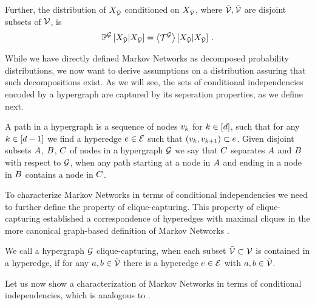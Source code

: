 Further, the distribution of $X_{\tilde{\mathcal{V}}}$ conditioned on $X_{\bar{\mathcal{V}}}$, where $\tilde{\mathcal{V}},\bar{\mathcal{V}}$ are disjoint subsets of $\mathcal{V}$, is
\begin{align*}
    \mathbb{P}^{\mathcal{G}}\left[X_{\tilde{\mathcal{V}}}|X_{\bar{\mathcal{V}}}\right]
    = \left\langle \mathcal{T}^{\mathcal{G}}\right\rangle \left[ X_{\tilde{\mathcal{V}}} | X_{\bar{\mathcal{V}}} \right] \, .
\end{align*}

While we have directly defined Markov Networks as decomposed probability distributions, we now want to derive assumptions on a distribution assuring that such decompositions exist.
As we will see, the sets of conditional independencies encoded by a hypergraph are captured by its seperation properties, as we define next.

\begin{definition}
    A path in a hypergraph is a sequence of nodes $v_{k}$ for $k\in[d]$, such that for any $k\in[d-1]$ we find a hyperedge $e\in\mathcal{E}$ such that $(v_{k}, v_{k+1})\subset e$.
    Given disjoint subsets $A$, $B$, $C$ of nodes in a hypergraph $\mathcal{G}$ we say that $C$ separates $A$ and $B$ with respect to $\mathcal{G}$, when any path starting at a node in $A$ and ending in a node in $B$ contains a node in $C$.
\end{definition}

To characterize Markov Networks in terms of conditional independencies we need to further define the property of clique-capturing.
This property of clique-capturing established a correspondence of hyperedges with maximal cliques in the more canonical graph-based definition of Markov Networks \cite{koller_probabilistic_2009}.

\begin{definition}
    \label{def:ccHypergraph}
    We call a hypergraph $\mathcal{G}$ clique-capturing, when each subset $\tilde{\mathcal{V}}\subset\mathcal{V}$ is contained in a hyperedge, if for any $a,b\in\tilde{\mathcal{V}}$ there is a hyperedge $e\in\mathcal{E}$ with $a,b\in\tilde{\mathcal{V}}$.
\end{definition}

Let us now show a characterization of Markov Networks in terms of conditional independencies, which is analogous to .

